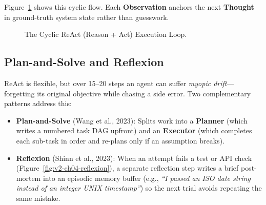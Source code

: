 Figure~\ref{fig:v2-ch04-react} shows this cyclic flow. Each \textbf{Observation} anchors the next \textbf{Thought} in ground-truth system state rather than guesswork.

\begin{figure}[htbp]
\centering
{}
\caption{The Cyclic ReAct (Reason + Act) Execution Loop.}
\label{fig:v2-ch04-react}
\end{figure}

\subsection{Plan-and-Solve and Reflexion}
ReAct is flexible, but over 15--20 steps an agent can suffer \emph{myopic drift}—forgetting its original objective while chasing a side error. Two complementary patterns address this:
\begin{itemize}[leftmargin=18pt]
  \item \textbf{Plan-and-Solve} (Wang et al., 2023): Splits work into a \textbf{Planner} (which writes a numbered task DAG upfront) and an \textbf{Executor} (which completes each sub-task in order and re-plans only if an assumption breaks).
  \item \textbf{Reflexion} (Shinn et al., 2023): When an attempt fails a test or API check (Figure~\ref{fig:v2-ch04-reflexion}), a separate reflection step writes a brief post-mortem into an episodic memory buffer (e.g., \emph{``I passed an ISO date string instead of an integer UNIX timestamp''}) so the next trial avoids repeating the same mistake.
\end{itemize}

